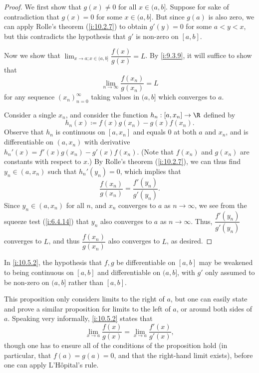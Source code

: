\begin{proof}
  We first show that \(g(x) \neq 0\) for all \(x \in (a, b]\).
  Suppose for sake of contradiction that \(g(x) = 0\) for some \(x \in (a, b]\).
  But since \(g(a)\) is also zero, we can apply Rolle's theorem (\cref{i:10.2.7}) to obtain \(g'(y) = 0\) for some \(a < y < x\), but this contradicts the hypothesis that \(g'\) is non-zero on \([a, b]\).

  Now we show that \(\lim_{x \to a ; x \in (a, b]} \dfrac{f(x)}{g(x)} = L\).
  By \cref{i:9.3.9}, it will suffice to show that
  \[
    \lim_{n \to \infty} \dfrac{f(x_n)}{g(x_n)} = L
  \]
  for any sequence \((x_n)_{n = 0}^\infty\) taking values in \((a, b]\) which converges to \(a\).

  Consider a single \(x_n\), and consider the function \(h_n : [a, x_n] \to \R\) defined by
  \[
    h_n(x) \coloneqq f(x) g(x_n) - g(x) f(x_n).
  \]
  Observe that \(h_n\) is continuous on \([a, x_n]\) and equals \(0\) at both \(a\) and \(x_n\), and is differentiable on \((a, x_n)\) with derivative \(h_n'(x) = f'(x) g(x_n) - g'(x) f(x_n)\).
  (Note that \(f(x_n)\) and \(g(x_n)\) are constants with respect to \(x\).)
  By Rolle's theorem (\cref{i:10.2.7}), we can thus find \(y_n \in (a, x_n)\) such that \(h_n'(y_n) = 0\), which implies that
  \[
    \dfrac{f(x_n)}{g(x_n)} = \dfrac{f'(y_n)}{g'(y_n)}.
  \]
  Since \(y_n \in (a, x_n)\) for all \(n\), and \(x_n\) converges to \(a\) as \(n \to \infty\), we see from the squeeze test (\cref{i:6.4.14}) that \(y_n\) also converges to \(a\) as \(n \to \infty\).
  Thus, \(\dfrac{f'(y_n)}{g'(y_n)}\) converges to \(L\), and thus \(\dfrac{f(x_n)}{g(x_n)}\) also converges to \(L\), as desired.
\end{proof}

\begin{note}
  In \cref{i:10.5.2}, the hypothesis that \(f, g\) be differentiable on \([a, b]\) may be weakened to being continuous on \([a, b]\) and differentiable on \((a, b]\), with \(g'\) only assumed to be non-zero on \((a, b]\) rather than \([a, b]\).
\end{note}

\begin{rmk}\label{i:10.5.3}
  This proposition only considers limits to the right of \(a\), but one can easily state and prove a similar proposition for limits to the left of \(a\), or around both sides of \(a\).
  Speaking very informally, \cref{i:10.5.2} states that
  \[
    \lim_{x \to a} \dfrac{f(x)}{g(x)} = \lim_{x \to a} \dfrac{f'(x)}{g'(x)},
  \]
  though one has to ensure all of the conditions of the proposition hold (in particular, that \(f(a) = g(a) = 0\), and that the right-hand limit exists), before one can apply L'Hôpital's rule.
\end{rmk}


